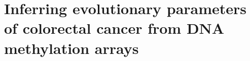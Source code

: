 \chapter{Inferring evolutionary parameters of colorectal cancer from DNA methylation arrays}\label{methchap}